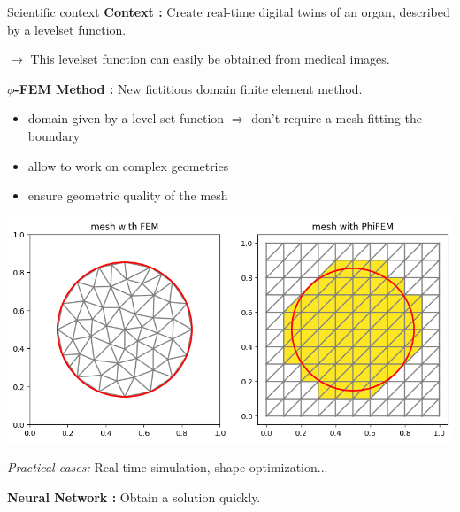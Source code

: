 \begin{frame}{Scientific context}
    \textbf{Context :} Create real-time digital twins of an organ, described by a levelset function.
    
    $\rightarrow$ This levelset function can easily be obtained from medical images.

    \textbf{$\phi$-FEM Method :} New fictitious domain finite element method.

    \begin{itemize}[]
        \item domain given by a level-set function $\Rightarrow$ don't require a mesh fitting the boundary 
        \item allow to work on complex geometries 
        \item ensure geometric quality of the mesh
    \end{itemize}
    
    \begin{center}
        \includegraphics[width=0.55\linewidth]{images/intro/context_geometry.png}
    \end{center}	

    \textit{Practical cases:} Real-time simulation, shape optimization...
    
    \textbf{Neural Network :} Obtain a solution quickly.
\end{frame}

